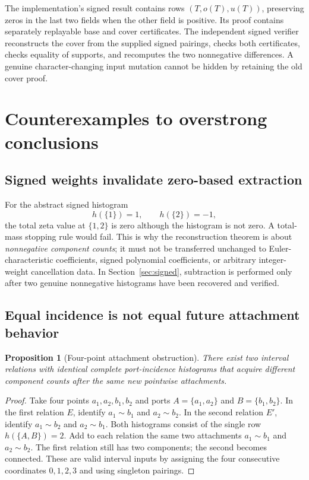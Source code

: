 \documentclass[11pt,letterpaper]{article}
\newtheorem{proposition}[theorem]{Proposition}
\begin{document}
The implementation's signed result contains rows $(T,o(T),u(T))$, preserving
zeros in the last two fields when the other field is positive. Its proof
contains separately replayable base and cover certificates. The independent
signed verifier reconstructs the cover from the supplied signed pairings,
checks both certificates, checks equality of supports, and recomputes the two
nonnegative differences. A genuine character-changing input mutation cannot
be hidden by retaining the old cover proof.

\section{Counterexamples to overstrong conclusions}
\label{sec:barriers}

\subsection{Signed weights invalidate zero-based extraction}
For the abstract signed histogram
\[
 h(\{1\})=1,\qquad h(\{2\})=-1,
\]
the total zeta value at $\{1,2\}$ is zero although the histogram is not zero.
A total-mass stopping rule would fail. This is why the reconstruction theorem
is about \emph{nonnegative component counts}; it must not be transferred
unchanged to Euler-characteristic coefficients, signed polynomial coefficients,
or arbitrary integer-weight cancellation data. In Section~\ref{sec:signed},
subtraction is performed only after two genuine nonnegative histograms have
been recovered and verified.

\subsection{Equal incidence is not equal future attachment behavior}
\begin{proposition}[Four-point attachment obstruction]
\label{prop:attachment}
There exist two interval relations with identical complete port-incidence
histograms that acquire different component counts after the same new
pointwise attachments.
\end{proposition}
\begin{proof}
Take four points $a_1,a_2,b_1,b_2$ and ports
$A=\{a_1,a_2\}$ and $B=\{b_1,b_2\}$. In the first relation $E$, identify
$a_1\sim b_1$ and $a_2\sim b_2$. In the second relation $E'$, identify
$a_1\sim b_2$ and $a_2\sim b_1$. Both histograms consist of the single row
$h(\{A,B\})=2$. Add to each relation the same two attachments
$a_1\sim b_1$ and $a_2\sim b_2$. The first relation still has two components;
the second becomes connected. These are valid interval inputs by assigning
the four consecutive coordinates $0,1,2,3$ and using singleton pairings.
\end{proof}
\end{document}
